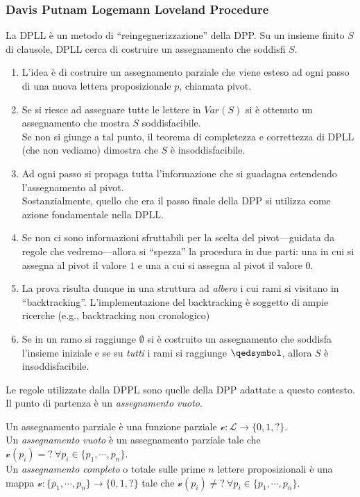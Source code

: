 \subsubsection{Davis Putnam Logemann Loveland Procedure}
\label{dpll}
La DPLL è un metodo di ``reingegnerizzazione'' della DPP. Su un insieme finito $S$ di clausole, DPLL cerca di costruire un assegnamento che soddisfi $S$.
\begin{enumerate}
  \item L'idea è di costruire un assegnamento parziale che viene esteso ad ogni passo di una nuova lettera proposizionale $p$, chiamata pivot.
  \item Se si riesce ad assegnare tutte le lettere in $Var(S)$ si è ottenuto un assegnamento che mostra $S$ soddisfacibile. \\
  Se non si giunge a tal punto, il teorema di completezza e correttezza di DPLL (che non vediamo) dimostra che $S$ è insoddisfacibile.
  \item Ad ogni passo si propaga tutta l'informazione  che si guadagna estendendo l'assegnamento al pivot. \\
  Sostanzialmente, quello che era il passo finale della DPP si utilizza come azione fondamentale nella DPLL.
  \item Se non ci sono informazioni sfruttabili per la scelta del pivot—guidata da regole che vedremo—allora si ``spezza'' la procedura in due parti: una in cui si assegna al pivot il valore $1$ e una a cui si assegna al pivot il valore $0$. \\
  \item La prova risulta dunque in una struttura ad \textit{albero} i cui rami si visitano in ``backtracking''. L'implementazione del backtracking è soggetto di ampie ricerche (e.g., backtracking non cronologico)
  \item Se in un ramo si raggiunge $\emptyset$ si è costruito un assegnamento che soddisfa l'insieme iniziale e se su \textit{tutti} i rami si raggiunge $\qedsymbol$, allora $S$ è insoddisfacibile.
\end{enumerate}

Le regole utilizzate dalla DPPL sono quelle della DPP adattate a questo contesto. \\
Il punto di partenza è un \textit{assegnamento vuoto}.

\begin{defi}
Un assegnamento parziale è una funzione parziale $\mathcal{v}: \mathscr{L} \rightarrow \{0,1,?\}$. \\
Un \textit{assegnamento vuoto} è un assegnamento parziale tale che $\mathcal{v}(p_i) = ?\ \forall p_i \in \{p_1, \cdots, p_n\}$. \\
Un \textit{assegnamento completo} o totale sulle prime $n$ lettere proposizionali è una mappa $\mathcal{v}: \{p_1, \cdots, p_n\} \rightarrow \{0,1,?\}$ tale che $\mathcal{v}(p_i) \neq ?\ \forall p_i \in \{p_1, \cdots, p_n\}$.
\end{defi}

